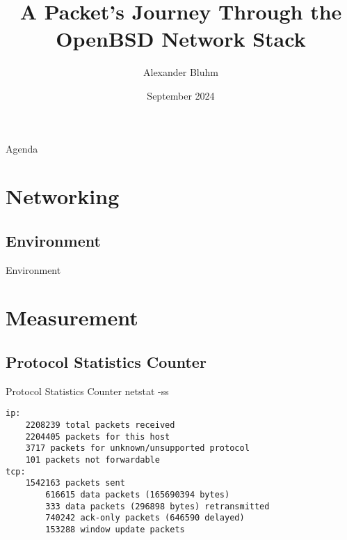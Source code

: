 \documentclass[14pt]{beamer}
\author{Alexander Bluhm}
\title{A Packet's Journey Through the OpenBSD Network Stack}
\institute{genua GmbH\\ \url{bluhm@genua.de}\\ \url{bluhm@openbsd.org}}
\date{September 2024}
\begin{document}
\begin{frame}
\titlepage
\end{frame}

\begin{frame}{Agenda}
\setcounter{tocdepth}{1}
\tableofcontents
\end{frame}

\section{Networking}

\subsection{Environment}
\begin{frame}{Environment}
\end{frame}

\section{Measurement}

\subsection{Protocol Statistics Counter}
\begin{frame}[fragile]{Protocol Statistics Counter}
netstat -ss
\scriptsize
\begin{verbatim}
ip:
    2208239 total packets received
    2204405 packets for this host
    3717 packets for unknown/unsupported protocol
    101 packets not forwardable
tcp:
    1542163 packets sent
        616615 data packets (165690394 bytes)
        333 data packets (296898 bytes) retransmitted
        740242 ack-only packets (646590 delayed)
        153288 window update packets
\end{verbatim}
\end{frame}
\end{document}
